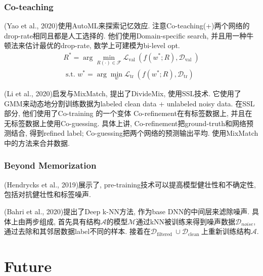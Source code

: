 \documentclass{beamer}
\begin{document}
\begin{frame}
    \frametitle{Co-teaching}

    (Yao et al., 2020)使用AutoML来探索记忆效应. 注意Co-teaching(+)两个网络的drop-rate相同且都是人工选择的. 他们使用Domain-specific search, 并且用一种牛顿法来估计最优的drop-rate, 数学上可建模为bi-level opt. 
    \begin{equation}
        \begin{array}{l}
        R^{*}=\arg \min _{R(\cdot) \in \mathcal{F}} \mathcal{L}_{\text {val }}\left(f\left(w^{*} ; R\right), \mathcal{D}_{\text {val }}\right) \\
        \text { s.t. } w^{*}=\arg \min _{w} \mathcal{L}_{\text {tr }}\left(f\left(w^{*} ; R\right), \mathcal{D}_{\operatorname{tr}}\right)
        \end{array}
    \end{equation}

    (Li et al., 2020)启发与MixMatch, 提出了DivideMix, 使用SSL技术. 它使用了GMM来动态地分割训练数据为labeled clean data + unlabeled noisy data. 在SSL部分, 他们使用了Co-training 的一个变体 Co-refinement在有标签数据上, 并且在无标签数据上使用Co-guessing. 具体上讲, Co-refinement把ground-truth和网络预测结合, 得到refined label; Co-guessing把两个网络的预测输出平均. 使用MixMatch中的方法来合并数据.

\end{frame}

\begin{frame}
    \frametitle{Beyond Memorization}

    (Hendrycks et al., 2019)展示了, pre-training技术可以提高模型健壮性和不确定性, 包括对抗健壮性和标签噪声. 

    (Bahri et al., 2020)提出了Deep k-NN方法, 作为base DNN的中间层来滤除噪声. 具体上由两步组成, 首先具有结构$\mathcal A$的模型$\mathcal M$通过kNN被训练来得到噪声数据$\mathcal {D}_{noise}$, 通过去除和其邻居数据label不同的样本. 接着在$\mathcal{D}_{\text {filtered }} \cup \mathcal{D}_{\text {clean }}$上重新训练结构$\mathcal A$.

\end{frame}

\section{Future}
\end{document}
